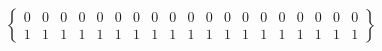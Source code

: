 \documentclass[nofonts]{ctexart}
\begin{document}
\[
	\begin{Bmatrix}
		0 &0 &0 &0 &0 &0 &0 &0 &0 &0 &0 &0 &0 &0 &0 &0 &0 &0 & 0 \\
		1 &1 &1 &1 &1 &1 &1 &1 &1 &1 &1 &1 &1 &1 &1 &1 &1 &1 & 1 
	\end{Bmatrix}
\]
\end{document}
